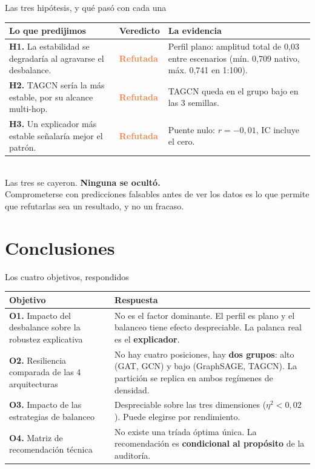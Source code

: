 \documentclass[aspectratio=169,11pt]{beamer}
\begin{document}
\begin{frame}{Las tres hipótesis, y qué pasó con cada una}
\begin{center}
\small
\renewcommand{\arraystretch}{1.7}
\begin{tabular}{p{}p{}p{}}
\toprule
\textbf{Lo que predijimos} & \textbf{Veredicto} & \textbf{La evidencia} \\
\midrule
\textbf{H1.} La estabilidad se degradaría al agravarse el desbalance. & \textcolor{coral}{\textbf{Refutada}} & Perfil plano: amplitud total de 0,03 entre escenarios (mín. 0,709 nativo, máx. 0,741 en 1:100). \\
\textbf{H2.} TAGCN sería la más estable, por su alcance multi-hop. & \textcolor{coral}{\textbf{Refutada}} & TAGCN queda en el grupo bajo en las 3 semillas. \\
\textbf{H3.} Un explicador más estable señalaría mejor el patrón. & \textcolor{coral}{\textbf{Refutada}} & Puente nulo: $r=-0{,}01$, IC incluye el cero. \\
\bottomrule
\end{tabular}
\\[10pt]
\footnotesize
Las tres se cayeron. \textbf{Ninguna se ocultó.}\\
Comprometerse con predicciones falsables antes de ver los datos es lo que permite que refutarlas sea un resultado, y no un fracaso.
\end{center}
\end{frame}

\section{Conclusiones}

\begin{frame}{Los cuatro objetivos, respondidos}
\begin{center}
\footnotesize
\renewcommand{\arraystretch}{1.55}
\begin{tabular}{p{}p{}}
\toprule
\textbf{Objetivo} & \textbf{Respuesta} \\
\midrule
\textbf{O1.} Impacto del desbalance sobre la robustez explicativa & No es el factor dominante. El perfil es plano y el balanceo tiene efecto despreciable. La palanca real es el \textbf{explicador}. \\
\textbf{O2.} Resiliencia comparada de las 4 arquitecturas & No hay cuatro posiciones, hay \textbf{dos grupos}: alto (GAT, GCN) y bajo (GraphSAGE, TAGCN). La partición se replica en ambos regímenes de densidad. \\
\textbf{O3.} Impacto de las estrategias de balanceo & Despreciable sobre las tres dimensiones ($\eta^2 < 0{,}02$). Puede elegirse por rendimiento. \\
\textbf{O4.} Matriz de recomendación técnica & No existe una tríada óptima única. La recomendación es \textbf{condicional al propósito} de la auditoría. \\
\bottomrule
\end{tabular}
\end{center}
\end{frame}
\end{document}
